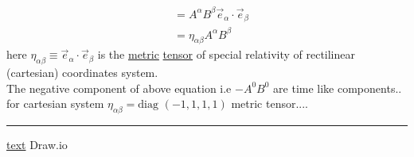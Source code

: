 \documentclass[11pt,a4paper]{article}
\begin{document}
\begin{enumerate}
\begin{enumerate}
\begin{enumerate}
\begin{align*}
                                                              & =A^\alpha B^\beta \vec{e}_\alpha \cdot \vec{e}_\beta \\
                                                              & =\eta_{\alpha\beta} A^\alpha B^\beta
                                    \end{align*}
                                    here $\eta_{\alpha\beta}\equiv\vec{e}_\alpha \cdot \vec{e}_\beta$ is the \underline{metric} \underline{tensor} of special relativity of rectilinear (cartesian) coordinates system.\\
                                    The negative component of above equation i.e $-A^0B^0$ are time like components..\\
                                    for cartesian system $\eta_{\alpha\beta}=\text{diag }(-1,1,1,1)$ metric tensor....





                        \end{enumerate}
            \end{enumerate}
\end{enumerate}
\noindent\rule{\textwidth}{1pt}
\href{https://youtu.be/TiHHz3sKDbY?list=PL6Q1107aDr%SgQ1DBEugejXLfQX76hfSnX&t=1188}{text} Draw.io
\end{document}
